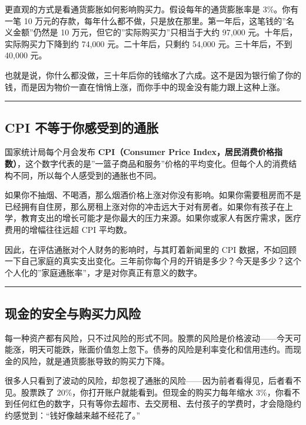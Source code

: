 \documentclass[a4paper,11pt,oneside,fontset=none,UTF8,zihao=-4]{ctexbook}
\begin{document}
更直观的方式是看通货膨胀如何影响购买力。假设每年的通货膨胀率是
3\%。你有一笔 10
万元的存款，每年什么都不做，只是放在那里。第一年后，这笔钱的''名义金额''仍然是
10 万元，但它的''实际购买力''只相当于大约 97,000
元。十年后，实际购买力下降到约 74,000 元。二十年后，只剩约 54,000
元。三十年后，不到 40,000 元。

也就是说，你什么都没做，三十年后你的钱缩水了六成。这不是因为银行偷了你的钱，而是因为物价一直在悄悄上涨，而你手中的现金没有能力跟上这种上涨。

\begin{center}{\color{dh-bronze}\rule{0.2\textwidth}{0.5pt}}\end{center}

\subsection{CPI
不等于你感受到的通胀}\label{cpi-ux4e0dux7b49ux4e8eux4f60ux611fux53d7ux5230ux7684ux901aux80c0}

国家统计局每个月会发布 \textbf{CPI（Consumer Price
Index，居民消费价格指数）}，这个数字代表的是''一篮子商品和服务''价格的平均变化。但每个人的消费结构不同，所以每个人感受到的通胀也不同。

如果你不抽烟、不喝酒，那么烟酒价格上涨对你没有影响。如果你需要租房而不是已经拥有自住房，那么房租上涨对你的冲击远大于对有房者。如果你有孩子在上学，教育支出的增长可能才是你最大的压力来源。如果你或家人有医疗需求，医疗费用的增幅往往远超
CPI 平均数。

因此，在评估通胀对个人财务的影响时，与其盯着新闻里的 CPI
数据，不如回顾一下自己家庭的真实支出变化。三年前你每个月的开销是多少？今天是多少？这个个人化的''家庭通胀率''，才是对你真正有意义的数字。

\begin{center}{\color{dh-bronze}\rule{0.2\textwidth}{0.5pt}}\end{center}

\subsection{现金的安全与购买力风险}\label{ux73b0ux91d1ux7684ux5b89ux5168ux4e0eux8d2dux4e70ux529bux98ceux9669}

每一种资产都有风险，只不过风险的形式不同。股票的风险是价格波动------今天可能涨，明天可能跌，账面价值忽上忽下。债券的风险是利率变化和信用违约。而现金的风险，就是通货膨胀导致的购买力下降。

很多人只看到了波动的风险，却忽视了通胀的风险------因为前者看得见，后者看不见。股票跌了
20\%，你打开账户就能看到。但现金的购买力每年缩水
3\%，你看不到任何红色的数字，只有等你去超市、去交房租、去付孩子的学费时，才会隐隐约约感觉到：``钱好像越来越不经花了。''
\end{document}
